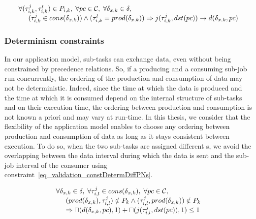 \documentclass[main.tex]{subfiles}
\begin{document}
\begin{equation}
    \label{eq_validation_constBwDataPrec}
    \begin{array}{l}
        \forall (\tau_{i,k}^j , \tau_{i,k}^l) \in P_{i,k}, \; \forall pc \in \mathcal{C} , \; \forall \delta_{x,k} \in \delta , \;  \\
        \hspace{5mm} (\tau_{i,k}^j \in cons(\delta_{x,k})) \land (\tau_{i,k}^l = prod(\delta_{x,k}))
        \Rightarrow j(\tau_{i,k}^j , dst(pc)) \to d( \delta_{x,k} , pc )  
    \end{array}
\end{equation}


\subsubsection{Determinism constraints}
In our application model, sub-tasks can exchange data, even without being constrained by precedence relations. So, if a producing and a consuming sub-job run concurrently, the ordering of the production and consumption of data may not be deterministic. Indeed, since the time at which the data is produced and the time at which it is consumed depend on the internal structure of sub-tasks and on their execution time, the ordering between production and consumption is not known a priori and may vary at run-time. In this thesis, we consider that the flexibility of the application model enables to choose any ordering between production and consumption of data as long as it stays consistent between execution. To do so, when the two sub-tasks are assigned different \PN{}s, we avoid the overlapping between the data interval during which the data is sent and the sub-job interval of the consumer using constraint~\ref{eq_validation_constDetermDiffPNs}.

\begin{equation}
    \label{eq_validation_constDetermDiffPNs}
    \begin{array}{l}
        \forall \delta_{x,k} \in \delta ,\; \forall \tau_{i,l}^j \in cons( \delta_{x,k} ), \; \forall pc \in \mathcal{C}, \\
        \hspace{5mm} ( prod(\delta_{x,k}), \tau_{i,l}^j ) \notin P_k \land (\tau_{i,l}^j, prod(\delta_{x,k})) \notin P_k \\
        \hspace{5mm} \Rightarrow \sqcap ( d(\delta_{x,k}, pc) ,1) + \sqcap ( j(\tau_{i,l}^j, dst(pc)) ,1) \leq 1
    \end{array}
\end{equation}
\end{document}
